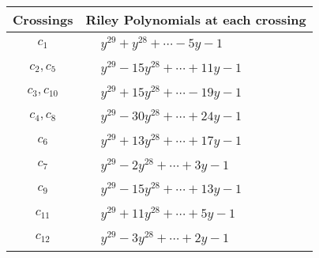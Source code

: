 \documentclass[1p]{elsarticle_modified}
\theoremstyle{definition}
\begin{document}
\begin{tabular}{m{50pt}|m{274pt}}
Crossings & \hspace{64pt}Riley Polynomials at each crossing \\
\hline $$\begin{aligned}c_{1}\end{aligned}$$&$\begin{aligned}
&y^{29}+y^{28}+\cdots-5 y-1
\end{aligned}$\\
\hline $$\begin{aligned}c_{2},c_{5}\end{aligned}$$&$\begin{aligned}
&y^{29}-15 y^{28}+\cdots+11 y-1
\end{aligned}$\\
\hline $$\begin{aligned}c_{3},c_{10}\end{aligned}$$&$\begin{aligned}
&y^{29}+15 y^{28}+\cdots-19 y-1
\end{aligned}$\\
\hline $$\begin{aligned}c_{4},c_{8}\end{aligned}$$&$\begin{aligned}
&y^{29}-30 y^{28}+\cdots+24 y-1
\end{aligned}$\\
\hline $$\begin{aligned}c_{6}\end{aligned}$$&$\begin{aligned}
&y^{29}+13 y^{28}+\cdots+17 y-1
\end{aligned}$\\
\hline $$\begin{aligned}c_{7}\end{aligned}$$&$\begin{aligned}
&y^{29}-2 y^{28}+\cdots+3 y-1
\end{aligned}$\\
\hline $$\begin{aligned}c_{9}\end{aligned}$$&$\begin{aligned}
&y^{29}-15 y^{28}+\cdots+13 y-1
\end{aligned}$\\
\hline $$\begin{aligned}c_{11}\end{aligned}$$&$\begin{aligned}
&y^{29}+11 y^{28}+\cdots+5 y-1
\end{aligned}$\\
\hline $$\begin{aligned}c_{12}\end{aligned}$$&$\begin{aligned}
&y^{29}-3 y^{28}+\cdots+2 y-1
\end{aligned}$\\
\hline
\end{tabular}\\~\\
\end{document}
